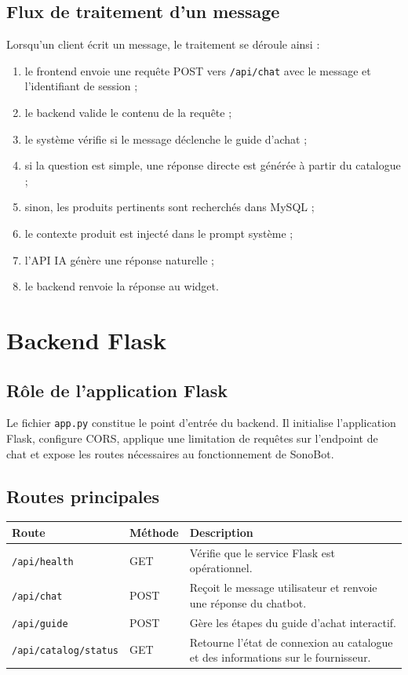 \documentclass[12pt,a4paper]{report}
\begin{document}
\section{Flux de traitement d'un message}

Lorsqu'un client écrit un message, le traitement se déroule ainsi :

\begin{enumerate}
    \item le frontend envoie une requête POST vers \texttt{/api/chat} avec le message et l'identifiant de session ;
    \item le backend valide le contenu de la requête ;
    \item le système vérifie si le message déclenche le guide d'achat ;
    \item si la question est simple, une réponse directe est générée à partir du catalogue ;
    \item sinon, les produits pertinents sont recherchés dans MySQL ;
    \item le contexte produit est injecté dans le prompt système ;
    \item l'API IA génère une réponse naturelle ;
    \item le backend renvoie la réponse au widget.
\end{enumerate}

\chapter{Backend Flask}

\section{Rôle de l'application Flask}

Le fichier \texttt{app.py} constitue le point d'entrée du backend. Il initialise l'application Flask, configure CORS, applique une limitation de requêtes sur l'endpoint de chat et expose les routes nécessaires au fonctionnement de SonoBot.

\section{Routes principales}

\begin{longtable}{p{4cm}p{3cm}p{7cm}}
\toprule
\textbf{Route} & \textbf{Méthode} & \textbf{Description} \\
\midrule
\texttt{/api/health} & GET & Vérifie que le service Flask est opérationnel. \\
\texttt{/api/chat} & POST & Reçoit le message utilisateur et renvoie une réponse du chatbot. \\
\texttt{/api/guide} & POST & Gère les étapes du guide d'achat interactif. \\
\texttt{/api/catalog/status} & GET & Retourne l'état de connexion au catalogue et des informations sur le fournisseur. \\
\bottomrule
\end{longtable}
\end{document}
